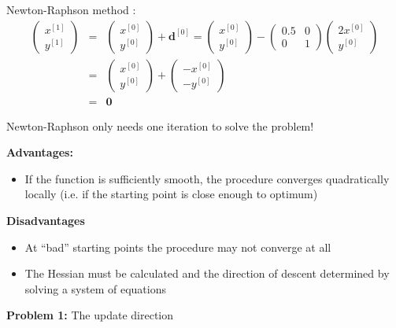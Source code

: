\documentclass[11pt,compress,t,notes=noshow, xcolor=table]{beamer}
\begin{document}
\begin{vbframe}{Newton-Raphson method}
:
\begin{eqnarray*}
\begin{pmatrix}
x^{[1]} \\
y^{[1]}
\end{pmatrix} &=& \begin{pmatrix}
x^{[0]} \\
y^{[0]}
\end{pmatrix} + \mathbf{d}^{[0]} = \begin{pmatrix}
x^{[0]} \\
y^{[0]}
\end{pmatrix} - \begin{pmatrix}
0.5 &  0 \\
0 & 1
\end{pmatrix} \begin{pmatrix}
2x^{[0]} \\
y^{[0]}
\end{pmatrix} \\
&=& \begin{pmatrix}
x^{[0]} \\
y^{[0]}
\end{pmatrix} + \begin{pmatrix}
-x^{[0]} \\
-y^{[0]}
\end{pmatrix} \\
&=& \mathbf{0}
\end{eqnarray*}

Newton-Raphson only needs one iteration to solve the problem!

\framebreak

\textbf{Advantages:}

\begin{itemize}
\item If the function is sufficiently smooth, the procedure converges quadratically locally (i.e. if the starting point is close enough to optimum)
\end{itemize}

\textbf{Disadvantages}

\begin{itemize}
\item At \enquote{bad} starting points the procedure may not converge at all
\item The Hessian must be calculated and the direction of descent determined by solving a system of equations
\end{itemize}

\lz

\textbf{Problem 1:} The update direction


\end{vbframe}
\end{document}
